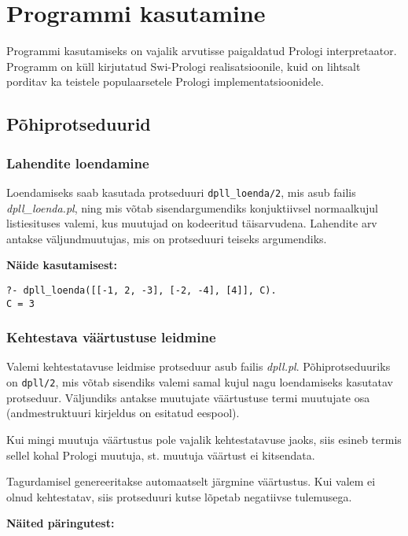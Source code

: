 \chapter{Programmi kasutamine}

Programmi kasutamiseks on vajalik arvutisse paigaldatud Prologi interpretaator.
Programm on küll kirjutatud Swi-Prologi realisatsioonile, kuid on lihtsalt
porditav ka teistele populaarsetele Prologi implementatsioonidele.

\section{Põhiprotseduurid}

\subsection{Lahendite loendamine}

Loendamiseks saab kasutada protseduuri \texttt{dpll\_loenda/2}, mis asub failis
\textit{dpll\_loenda.pl}, ning mis võtab sisendargumendiks konjuktiivsel
normaalkujul listiesituses valemi, kus muutujad on kodeeritud täisarvudena.
Lahendite arv antakse väljundmuutujas, mis on
protseduuri teiseks argumendiks.

\textbf{Näide kasutamisest:}

\begin{verbatim}
?- dpll_loenda([[-1, 2, -3], [-2, -4], [4]], C).
C = 3
\end{verbatim}

\subsection{Kehtestava väärtustuse leidmine}

Valemi kehtestatavuse leidmise protseduur asub failis \textit{dpll.pl}.
Põhiprotseduuriks on \texttt{dpll/2}, mis võtab sisendiks valemi samal
kujul nagu loendamiseks kasutatav protseduur. Väljundiks antakse muutujate
väärtustuse termi muutujate osa (andmestruktuuri kirjeldus on esitatud eespool).

Kui mingi muutuja väärtustus pole vajalik kehtestatavuse jaoks, siis esineb
termis sellel kohal Prologi muutuja, st. muutuja väärtust ei kitsendata.

Tagurdamisel genereeritakse automaatselt järgmine väärtustus. Kui valem ei
olnud kehtestatav, siis protseduuri kutse lõpetab negatiivse tulemusega.

\textbf{Näited päringutest:}

